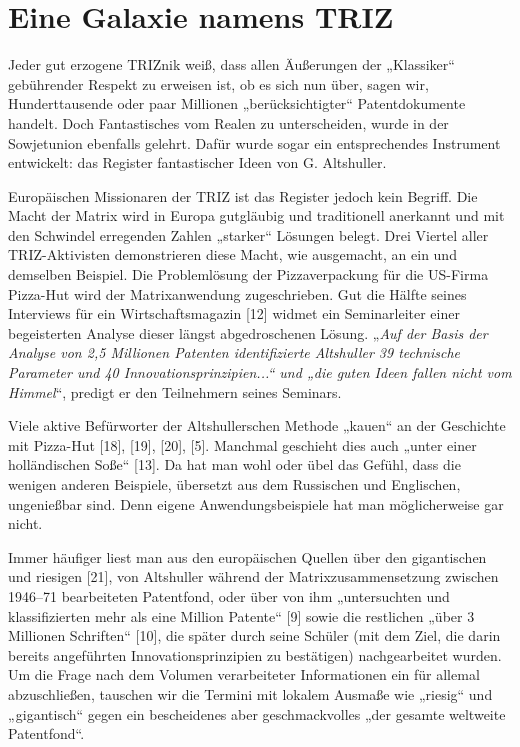 \documentclass[11pt,a4paper]{article}
\begin{document}
\section*{Eine Galaxie namens TRIZ}
Jeder gut erzogene TRIZnik weiß, dass allen Äußerungen der „Klassiker“
gebührender Respekt zu erweisen ist, ob es sich nun über, sagen wir,
Hunderttausende oder paar Millionen „berücksichtigter“ Patentdokumente
handelt. Doch Fantastisches vom Realen zu unterscheiden, wurde in der
Sowjetunion ebenfalls gelehrt. Dafür wurde sogar ein entsprechendes Instrument
entwickelt: das Register fantastischer Ideen von G. Altshuller.

Europäischen Missionaren der TRIZ ist das Register jedoch kein Begriff. Die
Macht der Matrix wird in Europa gutgläubig und traditionell anerkannt und mit
den Schwindel erregenden Zahlen „starker“ Lösungen belegt. Drei Viertel aller
TRIZ-Aktivisten demonstrieren diese Macht, wie ausgemacht, an ein und
demselben Beispiel. Die Problemlösung der Pizzaverpackung für die US-Firma
Pizza-Hut wird der Matrixanwendung zugeschrieben. Gut die Hälfte seines
Interviews für ein Wirtschaftsmagazin [12] widmet ein Seminarleiter einer
begeisterten Analyse dieser längst abgedroschenen Lösung. „\emph{Auf der Basis
  der Analyse von 2{,}5 Millionen Patenten identifizierte Altshuller 39
  technische Parameter und 40 Innovationsprinzipien...“ und „die guten Ideen
  fallen nicht vom Himmel}“, predigt er den Teilnehmern seines Seminars.

Viele aktive Befürworter der Altshullerschen Methode „kauen“ an der Geschichte
mit Pizza-Hut [18], [19], [20], [5]. Manchmal geschieht dies auch „unter einer
holländischen Soße“ [13]. Da hat man wohl oder übel das Gefühl, dass die
wenigen anderen Beispiele, übersetzt aus dem Russischen und Englischen,
ungenießbar sind. Denn eigene Anwendungsbeispiele hat man möglicherweise gar
nicht.

Immer häufiger liest man aus den europäischen Quellen über den gigantischen
und riesigen [21], von Altshuller während der Matrixzusammensetzung zwischen
1946--71 bearbeiteten Patentfond, oder über von ihm „untersuchten und
klassifizierten mehr als eine Million Patente“ [9] sowie die restlichen „über
3 Millionen Schriften“ [10], die später durch seine Schüler (mit dem Ziel, die
darin bereits angeführten Innovationsprinzipien zu bestätigen) nachgearbeitet
wurden. Um die Frage nach dem Volumen verarbeiteter Informationen ein für
allemal abzuschließen, tauschen wir die Termini mit lokalem Ausmaße wie
„riesig“ und „gigantisch“ gegen ein bescheidenes aber geschmackvolles „der
gesamte weltweite Patentfond“.
\end{document}
